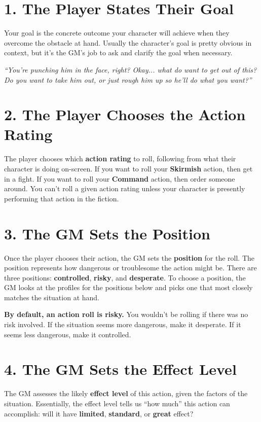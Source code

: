 \documentclass[11pt,oneside]{book}
\newcommand{\gameterm}[1]{\textbf{#1}}
\begin{document}
\section{1. The Player States Their Goal}

Your goal is the concrete outcome your character will achieve when they overcome the obstacle at hand. Usually the character’s goal is pretty obvious in context, but it’s the GM’s job to ask and clarify the goal when necessary.

\emph{“You’re punching him in the face, right? Okay... what do want to get out of this? Do you want to take him out, or just rough him up so he’ll do what you want?”}

\section{2. The Player Chooses the Action Rating}

The player chooses which \textbf{action rating} to roll, following from what their character is doing on-screen. If you want to roll your \gameterm{Skirmish}  action, then get in a fight. If you want to roll your \gameterm{Command}  action, then order someone around. You can’t roll a given action rating unless your character is presently performing that action in the fiction.

\section{3. The GM Sets the Position}

Once the player chooses their action, the GM sets the \textbf{position} for the roll. The position represents how dangerous or troublesome the action might be. There are three positions: \textbf{controlled}, \textbf{risky}, and \textbf{desperate}. To choose a position, the GM looks at the profiles for the positions below and picks one that most closely matches the situation at hand.

\textbf{By default, an action roll is risky.} You wouldn’t be rolling if there was no risk involved. If the situation seems more dangerous, make it desperate. If it seems less dangerous, make it controlled.

\section{4. The GM Sets the Effect Level}

The GM assesses the likely \textbf{effect level} of this action, given the factors of the situation. Essentially, the effect level tells us “how much” this action can accomplish: will it have \textbf{limited}, \textbf{standard}, or \textbf{great} effect?
\end{document}
